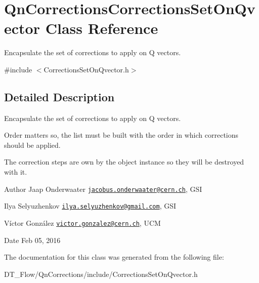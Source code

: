 \hypertarget{classQnCorrectionsCorrectionsSetOnQvector}{}\section{Qn\+Corrections\+Corrections\+Set\+On\+Qvector Class Reference}
\label{classQnCorrectionsCorrectionsSetOnQvector}


Encapsulate the set of corrections to apply on Q vectors.  




{\ttfamily \#include $<$Corrections\+Set\+On\+Qvector.\+h$>$}



\subsection{Detailed Description}
Encapsulate the set of corrections to apply on Q vectors. 

Order matters so, the list must be built with the order in which corrections should be applied.

The correction steps are own by the object instance so they will be destroyed with it.

\begin{DoxyAuthor}{Author}
Jaap Onderwaater \href{mailto:jacobus.onderwaater@cern.ch}{\tt jacobus.\+onderwaater@cern.\+ch}, G\+SI 

Ilya Selyuzhenkov \href{mailto:ilya.selyuzhenkov@gmail.com}{\tt ilya.\+selyuzhenkov@gmail.\+com}, G\+SI 

Víctor González \href{mailto:victor.gonzalez@cern.ch}{\tt victor.\+gonzalez@cern.\+ch}, U\+CM 
\end{DoxyAuthor}
\begin{DoxyDate}{Date}
Feb 05, 2016 
\end{DoxyDate}


The documentation for this class was generated from the following file\+:\begin{DoxyCompactItemize}
\item 
D\+T\+\_\+\+Flow/\+Qn\+Corrections/include/Corrections\+Set\+On\+Qvector.\+h\end{DoxyCompactItemize}
